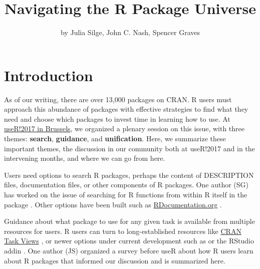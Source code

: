 \title{Navigating the R Package Universe}
\author{by Julia Silge, John C. Nash, Spencer Graves}

\maketitle



\hypertarget{introduction}{%
\section{Introduction}\label{introduction}}

As of our writing, there are over 13,000 packages on CRAN. R users must
approach this abundance of packages with effective strategies to find
what they need and choose which packages to invest time in learning how
to use. At \href{https://user2017.brussels/}{useR!2017 in Brussels}, we
organized a plenary session on this issue, with three themes:
\textbf{search}, \textbf{guidance}, and \textbf{unification}. Here, we
summarize these important themes, the discussion in our community both
at useR!2017 and in the intervening months, and where we can go from
here.

Users need options to search R packages, perhaps the content of
DESCRIPTION files, documentation files, or other components of R
packages. One author (SG) has worked on the issue of searching for R
functions from within R itself in the  package \citep{sos}.
Other options have been built such as
\href{https://www.rdocumentation.org/}{RDocumentation.org}
\citep{rdocumentation}.

Guidance about what package to use for any given task is available from
multiple resources for users. R users can turn to long-established
resources like \href{https://cloud.r-project.org/web/views/}{CRAN Task
Views} \citep{ctvs}, or newer options under current development such as
 \citep{packagemetrics} or the
 RStudio addin \citep{cransearcher}. One author
(JS) organized a survey before useR about how R users learn about R
packages that informed our discussion and is summarized here.

